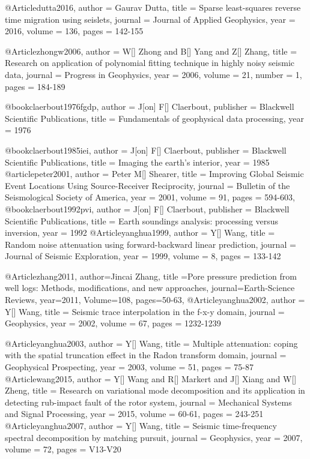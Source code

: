 @Article{dutta2016,
  author = 	 {Gaurav Dutta},
  title = 	 {Sparse least-squares reverse time migration using seislets},
  journal = 	 {Journal of Applied Geophysics},
  year = 	 2016,
  volume = 	 136,
  pages = 	 {142-155}}

@Article{zhongw2006,
  author = 	 {W[] Zhong and B[] Yang and Z[] Zhang},
  title = 	 {Research on application of polynomial fitting technique in highly noisy seismic data},
  journal = 	 {Progress in Geophysics},
  year = 	 2006,
  volume = 	 21,
  number = 	 1,
  pages = 	 {184-189}}

@book{claerbout1976fgdp,
   author = {J[on] F[] Claerbout},
   publisher = {Blackwell Scientific Publications},
   title = {Fundamentals of geophysical data processing},
   year = {1976}
}

@book{claerbout1985iei,
   author = {J[on] F[] Claerbout},
   publisher = {Blackwell Scientific Publications},
   title = {Imaging the earth's interior},
   year = {1985}
}
@article{peter2001,
  author =	 {Peter M[] Shearer},
  title =	 {Improving Global Seismic Event Locations Using Source-Receiver Reciprocity},
  journal = 	 {Bulletin of the Seismological Society of America},
  year = 	 2001,
  volume =	 91,
  pages =	 {594-603},
}
@book{claerbout1992pvi,
   author = {J[on] F[] Claerbout},
   publisher = {Blackwell Scientific Publications},
   title = {Earth soundings analysis: processing versus inversion},
   year = {1992}
}
@Article{yanghua1999,
  author = 	 {Y[] Wang},
  title = 	 {Random noise attenuation using forward-backward linear prediction},
  journal = 	 {Journal of Seismic Exploration},
  year = 	 1999,
  volume =	 8,
  pages =	 {133-142}
}

@Article{zhang2011,
  author={Jincai Zhang},
  title ={Pore pressure prediction from well logs: Methods, modifications, and new approaches},
  journal={Earth-Science Reviews},
  year=2011,
  Volume=108,
  pages={50-63},
}
@Article{yanghua2002,
  author = 	 {Y[] Wang},
  title = 	 {Seismic trace interpolation in the f-x-y domain},
  journal = 	 {Geophysics},
  year = 	 2002,
  volume =	 67,
  pages =	 {1232-1239}
}

@Article{yanghua2003,
  author = 	 {Y[] Wang},
  title = 	 {Multiple attenuation: coping with the spatial truncation effect in the Radon transform domain},
  journal = 	 {Geophysical Prospecting},
  year = 	 2003,
  volume =	 51,
  pages =	 {75-87}
}
@Article{wang2015,
  author = 	 {Y[] Wang and R[] Markert and J[] Xiang and W[] Zheng},
  title = 	 {Research on variational mode decomposition and its application in detecting rub-impact fault of the rotor system},
  journal = 	 {Mechanical Systems and Signal Processing},
  year = 	 2015,
  volume =	 60-61,
  pages =	 {243-251}
}
@Article{yanghua2007,
  author = 	 {Y[] Wang},
  title = 	 {Seismic time-frequency spectral decomposition by matching pursuit},
  journal = 	 {Geophysics},
  year = 	 2007,
  volume =	 72,
  pages =	 {V13-V20}
}

